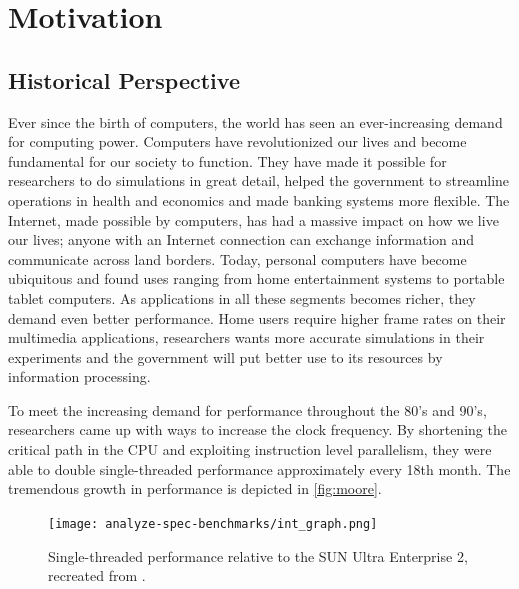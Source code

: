 \section{Motivation}

\subsection{Historical Perspective}

Ever since the birth of computers, the world has seen an ever-increasing demand
for computing power. Computers have revolutionized our lives and become
fundamental for our society to function. They have made it possible for
researchers to do simulations in great detail, helped the government to
streamline operations in health and economics and made banking systems more
flexible. The Internet, made possible by computers, has had a massive impact on
how we live our lives; anyone with an Internet connection can exchange
information and communicate across land borders. Today, personal computers have
become ubiquitous and found uses ranging from home entertainment systems to
portable tablet computers. As applications in all these segments becomes richer,
they demand even better performance. Home users require higher frame rates on
their multimedia applications, researchers wants more accurate simulations in
their experiments and the government will put better use to its resources by
information processing.

To meet the increasing demand for performance throughout the 80's and 90's,
researchers came up with ways to increase the clock frequency. By shortening the
critical path in the CPU and exploiting instruction level parallelism, they were
able to double single-threaded performance approximately every 18th month. The
tremendous growth in performance is depicted in \autoref{fig:moore}.

\begin{figure}
\texttt{[image: analyze-spec-benchmarks/int\_graph.png]}
\caption{Single-threaded performance relative to the SUN Ultra Enterprise 2,
recreated from \cite{preshing}.}
\label{fig:moore}
\end{figure}

